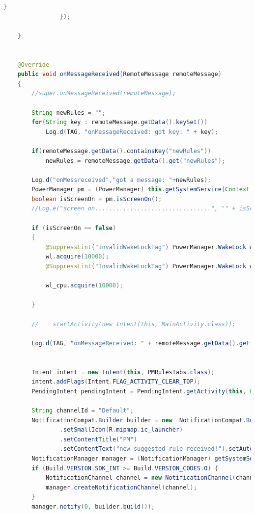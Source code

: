 \begin{lstlisting}[language=Java]
                    }
                });

    }


    @Override
    public void onMessageReceived(RemoteMessage remoteMessage)
    {
        //super.onMessageReceived(remoteMessage);

        String newRules = "";
        for(String key : remoteMessage.getData().keySet())
            Log.d(TAG, "onMessageReceived: got key: " + key);

        if(remoteMessage.getData().containsKey("newRules"))
            newRules = remoteMessage.getData().get("newRules");

        Log.d("onMessreceived","got a message: "+newRules);
        PowerManager pm = (PowerManager) this.getSystemService(Context.POWER_SERVICE);
        boolean isScreenOn = pm.isScreenOn();
        //Log.e("screen on.................................", "" + isScreenOn);

        if (isScreenOn == false)
        {
            @SuppressLint("InvalidWakeLockTag") PowerManager.WakeLock wl = pm.newWakeLock(PowerManager.FULL_WAKE_LOCK | PowerManager.ACQUIRE_CAUSES_WAKEUP | PowerManager.ON_AFTER_RELEASE, "MyLock");
            wl.acquire(10000);
            @SuppressLint("InvalidWakeLockTag") PowerManager.WakeLock wl_cpu = pm.newWakeLock(PowerManager.PARTIAL_WAKE_LOCK, "MyCpuLock");

            wl_cpu.acquire(10000);

        }

        //    startActivity(new Intent(this, MainActivity.class));

        Log.d(TAG, "onMessageReceived: " + remoteMessage.getData().get("message") + " to: " + remoteMessage.getTo());


        Intent intent = new Intent(this, PMRulesTabs.class);
        intent.addFlags(Intent.FLAG_ACTIVITY_CLEAR_TOP);
        PendingIntent pendingIntent = PendingIntent.getActivity(this, 0, intent, PendingIntent.FLAG_ONE_SHOT);

        String channelId = "Default";
        NotificationCompat.Builder builder = new  NotificationCompat.Builder(this, channelId)
                .setSmallIcon(R.mipmap.ic_launcher)
                .setContentTitle("PM")
                .setContentText("new suggested rule received!").setAutoCancel(true).setContentIntent(pendingIntent);;
        NotificationManager manager = (NotificationManager) getSystemService(NOTIFICATION_SERVICE);
        if (Build.VERSION.SDK_INT >= Build.VERSION_CODES.O) {
            NotificationChannel channel = new NotificationChannel(channelId, "Default channel", NotificationManager.IMPORTANCE_HIGH);
            manager.createNotificationChannel(channel);
        }
        manager.notify(0, builder.build());


\end{lstlisting}
